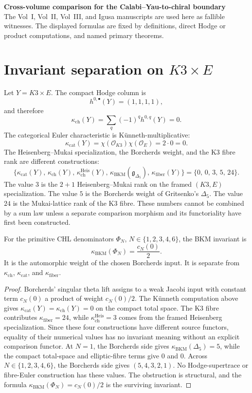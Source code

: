 \documentclass[10pt]{article}
\providecommand{\kch}{\kappa_{\mathrm{ch}}}
\providecommand{\kcat}{\kappa_{\mathrm{cat}}}
\providecommand{\kBKM}{\kappa_{\mathrm{BKM}}}
\providecommand{\kfib}{\kappa_{\mathrm{fiber}}}
\providecommand{\kHeis}{\kappa_{\mathrm{ch}}^{\mathrm{Heis}}}
\providecommand{\gDelta}{\mathfrak{g}_{\Delta_5}}
\begin{document}
\begin{center}
\textbf{Cross-volume comparison for the Calabi--Yau-to-chiral boundary}\\[2pt]
\small The Vol~I, Vol~II, Vol~III, and Igusa manuscripts are used here as
fallible witnesses.  The displayed formulas are fixed by definitions,
direct Hodge or product computations, and named primary theorems.
\end{center}

\section*{Invariant separation on \(K3\times E\)}

Let \(Y=K3\times E\).  The compact Hodge column is
\[
        h^{0,\bullet}(Y)=(1,1,1,1),
\]
and therefore
\[
        \kch(Y)=\sum_q(-1)^q h^{0,q}(Y)=0.
\]
The categorical Euler characteristic is K\"unneth-multiplicative:
\[
        \kcat(Y)=\chi(\mathcal O_{K3})\chi(\mathcal O_E)=2\cdot0=0.
\]
The Heisenberg--Mukai specialization, the Borcherds weight, and the
K3 fibre rank are different constructions:
\[
 \{\kcat(Y),\,\kch(Y),\,\kHeis(Y),\,\kBKM(\gDelta),\,\kfib(Y)\}
 =
 \{0,\,0,\,3,\,5,\,24\}.
\]
The value \(3\) is the \(2+1\) Heisenberg--Mukai rank on the framed
\((K3,E)\) specialization.  The value \(5\) is the Borcherds weight of
Gritsenko's \(\Delta_5\).  The value \(24\) is the Mukai-lattice rank
of the K3 fibre.  These numbers cannot be combined by a sum law
unless a separate comparison morphism and its functoriality have first
been constructed.

\begin{proposition}
\label{prop:crossvol-no-additive-invariant-law}
For the primitive CHL denominators \(\Phi_N\), \(N\in\{1,2,3,4,6\}\),
the BKM invariant is
\[
        \kBKM(\Phi_N)=\frac{c_N(0)}{2}.
\]
It is the automorphic weight of the chosen Borcherds input.  It is
separate from \(\kch\), \(\kcat\), and \(\kfib\).
\end{proposition}

\begin{proof}
Borcherds' singular theta lift assigns to a weak Jacobi input with
constant term \(c_N(0)\) a product of weight \(c_N(0)/2\).  The
K\"unneth computation above gives \(\kcat(Y)=\kch(Y)=0\) on the compact
total space.  The K3 fibre contributes \(\kfib=24\), while
\(\kHeis=3\) comes from the framed Heisenberg specialization.  Since
these four constructions have different source functors, equality of
their numerical values has no invariant meaning without an explicit
comparison functor.  At \(N=1\), the Borcherds side gives
\(\kBKM(\Delta_5)=5\), while the compact total-space and elliptic-fibre
terms give \(0\) and \(0\).  Across
\(N\in\{1,2,3,4,6\}\), the Borcherds side gives
\((5,4,3,2,1)\).  No Hodge-supertrace or fibre-Euler construction
has these values.  The obstruction is structural, and the formula
\(\kBKM(\Phi_N)=c_N(0)/2\) is the surviving invariant.
\end{proof}
\end{document}
